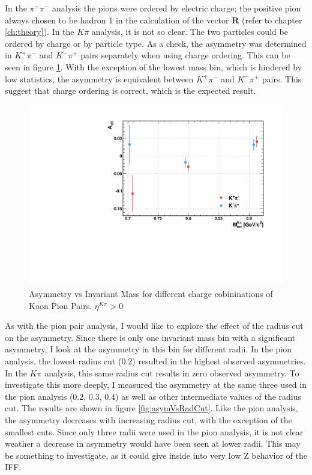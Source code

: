 \documentclass[abstract = on,listof=totoc, bibliography=totoc]{scrreprt}
\newcommand{\pip}{\pi^+}
\newcommand{\pim}{\pi^-}
\newcommand{\pair}{$\pip\pim$ }
\newcommand{\etakp}{\eta^{K\pi}}
\begin{document}
In the \pair analysis the pions were ordered by electric charge; the positive pion always chosen to be hadron 1 in the calculation of the vector $\bm{R}$ (refer to chapter \ref{ch:theory}). In the $K\pi$ analysis, it is not so clear. The two particles could be ordered by charge or by particle type. As a check, the asymmetry was determined in $K^+\pi^-$ and $K^-\pi^+$ pairs separately when using charge ordering. This can be seen in figure \ref{fig:mAsymSeperateCharges}. With the exception of the lowest mass bin, which is hindered by low statistics, the asymmetry is equivalent between $K^+\pi^-$ and $K^-\pi^+$ pairs. This suggest that charge ordering is correct, which is the expected result. 
\begin{figure}
\begin{center}
\includegraphics[width = .6\textwidth]{mAsymSeperateCharges}
\caption[Asymmetry vs Invariant Mass for different charge cobininations of Kaon Pion Pairs]{Asymmetry vs Invariant Mass for different charge cobininations of Kaon Pion Pairs. $\etakp > 0$}
\label{fig:mAsymSeperateCharges}
\end{center}
\end{figure}

As with the pion pair analysis, I would like to explore the effect of the radius cut on the asymmetry. Since there is only one invariant mass bin with a significant asymmetry, I look at the asymmetry in this bin for different radii. In the pion analysis, the lowest radius cut (0.2) resulted in the highest observed asymmetries. In the $K\pi$ analysis, this same radius cut results in zero observed asymmetry. To investigate this more deeply, I measured the asymmetry at the same three used in the pion analysis (0.2, 0.3, 0.4) as well as other intermediate values of the radius cut. The results are shown in figure \ref{fig:asymVsRadCut}. Like the pion analysis, the asymmetry decreases with increasing radius cut, with the exception of the smallest cuts. Since only three radii were used in the pion analysis, it is not clear weather a decrease in asymmetry would have been seen at lower radii. This may be something to investigate, as it could give inside into very low Z behavior of the IFF. 
\end{document}
